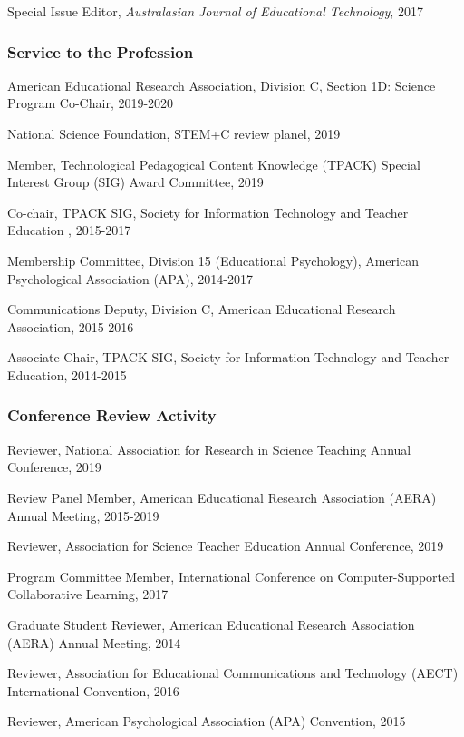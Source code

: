 \documentclass[14,]{article}
\begin{document}
Special Issue Editor, \emph{Australasian Journal of Educational
Technology}, 2017

\hypertarget{service-to-the-profession}{%
\subsubsection{Service to the
Profession}\label{service-to-the-profession}}

American Educational Research Association, Division C, Section 1D:
Science Program Co-Chair, 2019-2020

National Science Foundation, STEM+C review planel, 2019

Member, Technological Pedagogical Content Knowledge (TPACK) Special
Interest Group (SIG) Award Committee, 2019

Co-chair, TPACK SIG, Society for Information Technology and Teacher
Education , 2015-2017

Membership Committee, Division 15 (Educational Psychology), American
Psychological Association (APA), 2014-2017

Communications Deputy, Division C, American Educational Research
Association, 2015-2016

Associate Chair, TPACK SIG, Society for Information Technology and
Teacher Education, 2014-2015

\hypertarget{conference-review-activity}{%
\subsubsection{Conference Review
Activity}\label{conference-review-activity}}

Reviewer, National Association for Research in Science Teaching Annual
Conference, 2019

Review Panel Member, American Educational Research Association (AERA)
Annual Meeting, 2015-2019

Reviewer, Association for Science Teacher Education Annual Conference,
2019

Program Committee Member, International Conference on Computer-Supported
Collaborative Learning, 2017

Graduate Student Reviewer, American Educational Research Association
(AERA) Annual Meeting, 2014

Reviewer, Association for Educational Communications and Technology
(AECT) International Convention, 2016

Reviewer, American Psychological Association (APA) Convention, 2015
\end{document}

